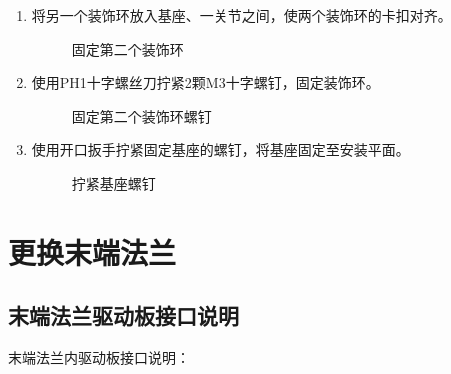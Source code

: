 \documentclass[a4paper,11pt,english,openany,oneside]{sphinxmanual}
\begin{document}
\begin{enumerate}
\begin{figure}[H]
\noindent{}
\caption{固定第一个装饰环螺钉}\label{\detokenize{_u66f4_u6362_u57fa_u5ea7:id26}}\end{figure}

\item {} 
\sphinxAtStartPar
将另一个装饰环放入基座、一关节之间，使两个装饰环的卡扣对齐。

\begin{figure}[H]
\centering
\capstart

\noindent{}
\caption{固定第二个装饰环}\label{\detokenize{_u66f4_u6362_u57fa_u5ea7:id27}}\end{figure}

\item {} 
\sphinxAtStartPar
使用PH1十字螺丝刀拧紧2颗M3十字螺钉，固定装饰环。

\begin{figure}[H]
\centering
\capstart

\noindent{}
\caption{固定第二个装饰环螺钉}\label{\detokenize{_u66f4_u6362_u57fa_u5ea7:id28}}\end{figure}

\item {} 
\sphinxAtStartPar
使用开口扳手拧紧固定基座的螺钉，将基座固定至安装平面。

\begin{figure}[H]
\centering
\capstart

\noindent{}
\caption{拧紧基座螺钉}\label{\detokenize{_u66f4_u6362_u57fa_u5ea7:id29}}\end{figure}

\end{enumerate}

\sphinxstepscope


\section{更换末端法兰}
\label{\detokenize{_u66f4_u6362_u672b_u7aef_u6cd5_u5170:id1}}\label{\detokenize{_u66f4_u6362_u672b_u7aef_u6cd5_u5170:id2}}\label{\detokenize{_u66f4_u6362_u672b_u7aef_u6cd5_u5170::doc}}

\subsection{末端法兰驱动板接口说明}
\label{\detokenize{_u66f4_u6362_u672b_u7aef_u6cd5_u5170:id3}}\label{\detokenize{_u66f4_u6362_u672b_u7aef_u6cd5_u5170:id4}}
\sphinxAtStartPar
末端法兰内驱动板接口说明：
\end{document}
